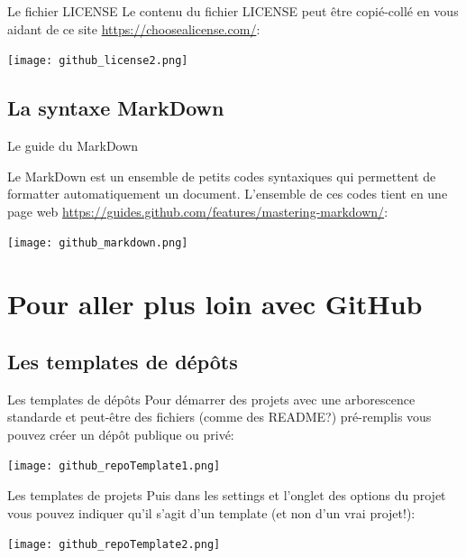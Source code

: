 \documentclass{beamer}
\begin{document}
\begin{frame}{Le fichier LICENSE}
Le contenu du fichier LICENSE peut être copié-collé en vous aidant de ce site \url{https://choosealicense.com/}:
\begin{center}
	\texttt{[image: github\_license2.png]}
\end{center}
\end{frame}


\subsection{La syntaxe MarkDown}
\begin{frame}{Le guide du MarkDown}

Le MarkDown est un ensemble de petits codes syntaxiques qui permettent de formatter automatiquement un document. L'ensemble de ces codes tient en une page web \url{https://guides.github.com/features/mastering-markdown/}: 
\begin{center}
	\texttt{[image: github\_markdown.png]}
\end{center}
\end{frame}




\section{Pour aller plus loin avec GitHub}


\subsection{Les templates de dépôts}
\begin{frame}{Les templates de dépôts}
Pour démarrer des projets avec une arborescence standarde et peut-être des fichiers (comme des README?) pré-remplis vous pouvez créer un dépôt publique ou privé:
\begin{center}
	\texttt{[image: github\_repoTemplate1.png]}
\end{center}
\end{frame}

\begin{frame}{Les templates de projets}
Puis dans les settings et l'onglet des options du projet vous pouvez indiquer qu'il s'agit d'un template (et non d'un vrai projet!):
\begin{center}
	\texttt{[image: github\_repoTemplate2.png]}
\end{center}
\end{frame}
\end{document}
